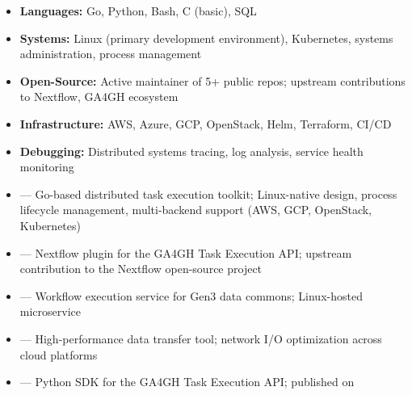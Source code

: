 




\begin{itemize}
    \item \textbf{Languages:} Go, Python, Bash, C (basic), SQL
    \item \textbf{Systems:} Linux (primary development environment), Kubernetes, systems administration, process management
    \item \textbf{Open-Source:} Active maintainer of 5+ public repos; upstream contributions to Nextflow, GA4GH ecosystem
    \item \textbf{Infrastructure:} AWS, Azure, GCP, OpenStack, Helm, Terraform, CI/CD
    \item \textbf{Debugging:} Distributed systems tracing, log analysis, service health monitoring
\end{itemize}


\begin{itemize}
    \item {} --- Go-based distributed task execution toolkit; Linux-native design, process lifecycle management, multi-backend support (AWS, GCP, OpenStack, Kubernetes)
    \item {} --- Nextflow plugin for the GA4GH Task Execution API; upstream contribution to the Nextflow open-source project
    \item {} --- Workflow execution service for Gen3 data commons; Linux-hosted microservice
    \item {} --- High-performance data transfer tool; network I/O optimization across cloud platforms
    \item {} --- Python SDK for the GA4GH Task Execution API; published on 
\end{itemize}


